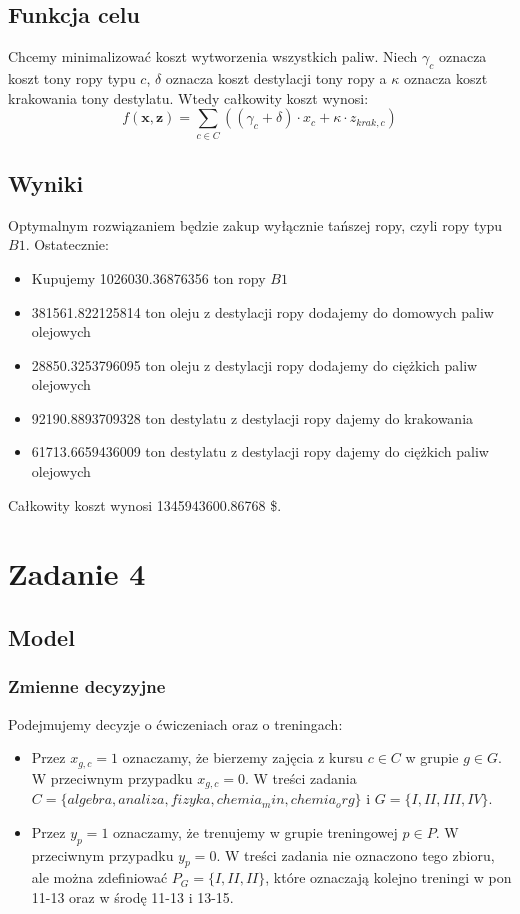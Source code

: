 \documentclass{article}
\def\x{\textbf{x}}
\def\z{\textbf{z}}
\begin{document}
\subsection{Funkcja celu}
Chcemy minimalizować koszt wytworzenia wszystkich paliw. Niech $\gamma_c$ oznacza koszt tony ropy typu $c$, $\delta$ oznacza koszt destylacji tony ropy a $\kappa$ oznacza koszt krakowania tony destylatu. Wtedy całkowity koszt wynosi:
$$f(\x, \z)=  \sum_{c \in C} ((\gamma_{c} + \delta) \cdot  x_{c} + \kappa \cdot  z_{krak, c})$$

\subsection{Wyniki}
Optymalnym rozwiązaniem będzie zakup wyłącznie tańszej ropy, czyli ropy typu $B1$. Ostatecznie:
\begin{itemize}
    \item Kupujemy 1026030.36876356 ton ropy $B1$
    \item 381561.822125814 ton oleju z destylacji ropy dodajemy do domowych paliw olejowych
    \item 28850.3253796095 ton oleju z destylacji ropy dodajemy do ciężkich paliw olejowych
    \item 92190.8893709328 ton destylatu z destylacji ropy dajemy do krakowania
    \item 61713.6659436009 ton destylatu z destylacji ropy dajemy do ciężkich paliw olejowych
\end{itemize}
Całkowity koszt wynosi 1345943600.86768 \$.


\section{Zadanie 4}
\subsection{Model}
\subsubsection{Zmienne decyzyjne}
Podejmujemy decyzje o ćwiczeniach oraz o treningach:
\begin{itemize}
    \item Przez $x_{g, c}=1$ oznaczamy, że bierzemy zajęcia z kursu $c\in C$ w grupie $g\in G$. W przeciwnym przypadku $x_{g, c}=0$. W treści zadania $C=\{algebra ,analiza, fizyka, chemia_min ,chemia_org\}$ i $G=\{I,II,III,IV\}$. 
    \item Przez $y_{p}=1$ oznaczamy, że trenujemy w grupie treningowej $p\in P$. W przeciwnym przypadku $y_p=0$. W treści zadania nie oznaczono tego zbioru, ale można zdefiniować $P_G=\{I,II,II\}$, które oznaczają kolejno treningi w pon 11-13 oraz w środę 11-13 i 13-15. 
\end{itemize}
\end{document}
